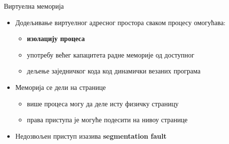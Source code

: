 \documentclass[xcolor=table]{beamer}
\begin{document}
    \begin{frame}[allowframebreaks]{Виртуелна меморија}
        \begin{itemize}
            \item Додељивање виртуелног адресног простора сваком процесу омогућава:
            \begin{itemize}
                \item \textbf{изолацију процеса}
                \item употребу већег капацитета радне меморије од доступног
                \item дељење заједничког кода код динамички везаних програма
            \end{itemize}
            \item Меморија се дели на странице
            \begin{itemize}
                \item више процеса могу да деле исту физичку страницу
                \item права приступа је могуће подесити на нивоу странице
            \end{itemize}
            \item Недозвољен приступ изазива \textbf{segmentation fault}
        \end{itemize}
        
        \framebreak
        

\end{frame}
\end{document}
